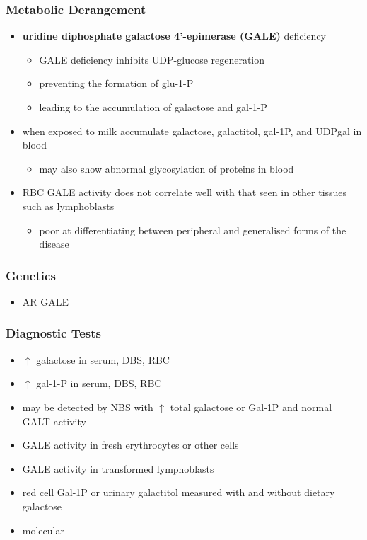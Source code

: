 \documentclass[12pt]{scrartcl}
\begin{document}
\subsubsection{Metabolic Derangement}
\label{sec:orgb81ce5b}
\begin{itemize}
\item \textbf{uridine diphosphate galactose 4’-epimerase (GALE)} deficiency
\begin{itemize}
\item GALE deficiency inhibits UDP-glucose regeneration
\item preventing the formation of glu-1-P
\item leading to the accumulation of galactose and gal-1-P
\end{itemize}
\item when exposed to milk accumulate galactose, galactitol, gal-1P, and
UDPgal in blood
\begin{itemize}
\item may also show abnormal glycosylation of proteins in blood
\end{itemize}
\item RBC GALE activity does not correlate well with that seen in
other tissues such as lymphoblasts
\begin{itemize}
\item poor at differentiating between peripheral and generalised forms
of the disease
\end{itemize}
\end{itemize}

\subsubsection{Genetics}
\label{sec:org5960856}
\begin{itemize}
\item AR GALE
\end{itemize}

\subsubsection{Diagnostic Tests}
\label{sec:orgec99904}
\begin{itemize}
\item \(\uparrow\) galactose in serum, DBS, RBC
\item \(\uparrow\) gal-1-P in serum, DBS, RBC
\item may be detected by NBS with \(\uparrow\) total galactose or Gal-1P and normal GALT activity
\item GALE activity in fresh erythrocytes or other cells
\item GALE activity in transformed lymphoblasts
\item red cell Gal-1P or urinary galactitol measured with and without dietary galactose
\item molecular
\end{itemize}
\end{document}
